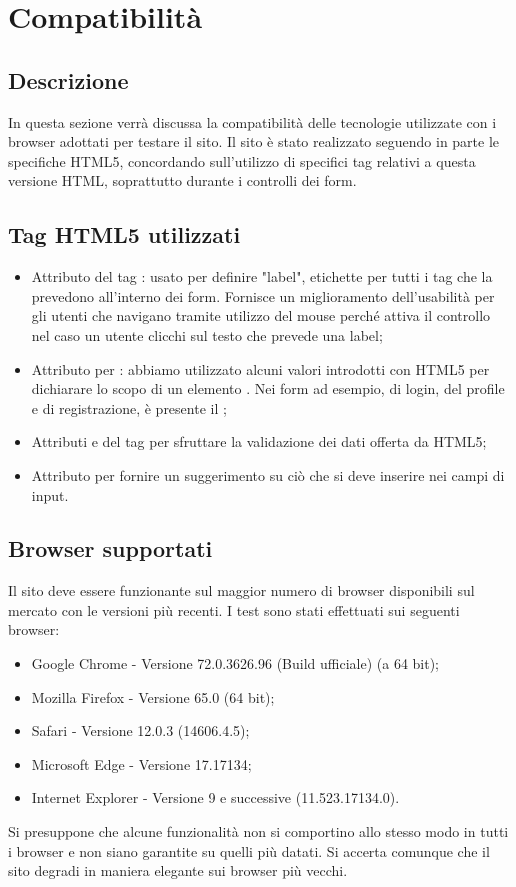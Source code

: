 \documentclass[12pt]{article}
\begin{document}
	\section{Compatibilità}
	\subsection{Descrizione}
	In questa sezione verrà discussa la compatibilità delle tecnologie utilizzate con i browser adottati per testare il sito. Il sito è stato realizzato seguendo in parte le specifiche HTML5, concordando sull'utilizzo  di specifici tag relativi a questa versione HTML, soprattutto durante i controlli dei form.
	\subsection{Tag HTML5 utilizzati}
	\begin{itemize}
		\item Attributo  del tag \textbf{}: usato per definire "label", etichette per tutti i tag che la prevedono all'interno dei form. Fornisce un miglioramento dell'usabilità per gli utenti che navigano tramite utilizzo del mouse perché attiva il controllo nel caso un utente clicchi sul testo che prevede una label;
		\item Attributo  per : abbiamo utilizzato alcuni valori introdotti con HTML5 per dichiarare lo scopo di un elemento . Nei form ad esempio, di login, del profile e di registrazione, è presente il ;
		\item Attributi  e  del tag  per sfruttare la validazione dei dati offerta da HTML5;
		\item Attributo  per fornire un suggerimento su ciò che si deve inserire nei campi di input.
	\end{itemize}
	\subsection{Browser supportati}
	Il sito deve essere funzionante sul maggior numero di browser disponibili sul mercato con le versioni più recenti. I test sono stati effettuati sui seguenti browser:
		\begin{itemize}
			\item Google Chrome - Versione 72.0.3626.96 (Build ufficiale) (a 64 bit);
			\item Mozilla Firefox - Versione 65.0 (64 bit);
			\item Safari - Versione 12.0.3 (14606.4.5);
			\item Microsoft Edge - Versione 17.17134;
			\item Internet Explorer - Versione 9 e successive (11.523.17134.0).
		\end{itemize}
	Si presuppone che alcune funzionalità non si comportino allo stesso modo in tutti i browser e non siano garantite su quelli più datati. Si accerta comunque che il sito degradi in	maniera elegante sui browser più vecchi.
\end{document}
